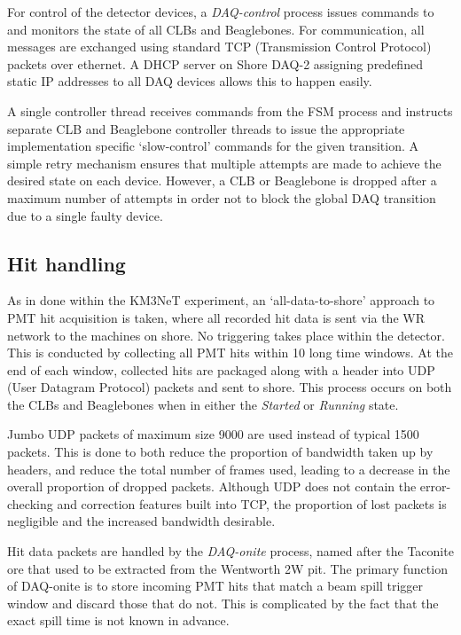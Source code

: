 For control of the detector devices, a \emph{DAQ-control} process issues commands to and monitors
the state of all CLBs and Beaglebones. For communication, all messages are exchanged using
standard TCP (Transmission Control Protocol) packets over ethernet. A DHCP server on Shore DAQ-2
assigning predefined static IP addresses to all DAQ devices allows this to happen easily. 

A single controller thread receives commands from the FSM process and instructs separate CLB and
Beaglebone controller threads to issue the appropriate implementation specific `slow-control'
commands for the given transition. A simple retry mechanism ensures that multiple attempts are
made to achieve the desired state on each device. However, a CLB or Beaglebone is dropped after a
maximum number of attempts in order not to block the global DAQ transition due to a single faulty
device.

\subsection{Hit handling} %
\label{sec:daq_soft_hits} %

As in done within the KM3NeT experiment, an `all-data-to-shore' approach to PMT hit acquisition is
taken, where all recorded hit data is sent via the WR network to the machines on shore. No
triggering takes place within the detector. This is conducted by collecting all PMT hits within
\unit{10}{} long time windows. At the end of each window, collected hits are packaged
along with a header into UDP (User Datagram Protocol) packets and sent to shore. This process
occurs on both the CLBs and Beaglebones when in either the \emph{Started} or \emph{Running} state.

Jumbo UDP packets of maximum size \unit{9000}{} are used instead of typical
\unit{1500}{} packets. This is done to both reduce the proportion of bandwidth taken
up by headers, and reduce the total number of frames used, leading to a decrease in the overall
proportion of dropped packets. Although UDP does not contain the error-checking and correction
features built into TCP, the proportion of lost packets is negligible and the increased bandwidth
desirable.

Hit data packets are handled by the \emph{DAQ-onite} process, named after the Taconite ore that
used to be extracted from the Wentworth 2W pit. The primary function of DAQ-onite is to store
incoming PMT hits that match a \numi beam spill trigger window and discard those that do not. This
is complicated by the fact that the exact \numi spill time is not known in advance.



